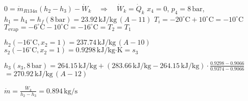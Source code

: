 \( 0 = \dot{m}_{R134a} (h_2 - h_3) - \dot{W}_k \quad \Rightarrow \quad \dot{W}_k = \dot{Q}_k \)  
\( x_4 = 0 \), \( p_4 = 8 \, \text{bar} \), \( h_1 = h_4 = h_f(8 \, \text{bar}) = 23.92 \, \text{kJ/kg} \, (A-11) \)  
\( T_i = -20^\circ \text{C} + 10^\circ \text{C} = -10^\circ \text{C} \)  
\( T_{\text{evap}} = -6^\circ \text{C} - 10^\circ \text{C} = -16^\circ \text{C} = T_2 = T_1 \)  

\( h_2(-16^\circ \text{C}, x_2 = 1) = 237.74 \, \text{kJ/kg} \, (A-10) \)  
\( s_2(-16^\circ \text{C}, x_2 = 1) = 0.9298 \, \text{kJ/kg·K} = s_3 \)  

\( h_3(s_3, 8 \, \text{bar}) = 264.15 \, \text{kJ/kg} + (283.66 \, \text{kJ/kg} - 264.15 \, \text{kJ/kg}) \cdot \frac{0.9298 - 0.9066}{0.9374 - 0.9066} \)  
\( = 270.92 \, \text{kJ/kg} \, (A-12) \)  

\( \dot{m} = \frac{\dot{W}_k}{h_2 - h_3} = 0.894 \, \text{kg/s} \)